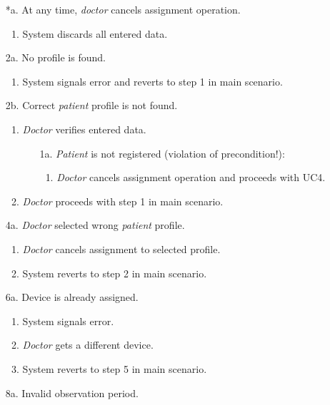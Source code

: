 \documentclass[fontsize=12pt,
               paper=a4,
               twoside=false,
               parskip=half,
               ]{scrartcl}
\begin{document}

\begin{itemize}[leftmargin=3em]
	\item[*a.] At any time, \emph{doctor} cancels assignment operation.
	\begin{enumerate}
		\item System discards all entered data.
	\end{enumerate}
	\item[2a.] No profile is found.
	\begin{enumerate}
		\item System signals error and reverts to step 1 in main scenario.
	\end{enumerate}
	\item[2b.] Correct \emph{patient} profile is not found.
	\begin{enumerate}
		\item \emph{Doctor} verifies entered data.
		\begin{itemize}
			\item[1a.] \emph{Patient} is not registered (violation of precondition!):
			\begin{enumerate}[label=\arabic*.]
				\item \emph{Doctor} cancels assignment operation and proceeds with UC4.
			\end{enumerate}
		\end{itemize}
		\item \emph{Doctor} proceeds with step 1 in main scenario.
	\end{enumerate}
	\item[4a.] \emph{Doctor} selected wrong \emph{patient} profile.
	\begin{enumerate}
		\item \emph{Doctor} cancels assignment to selected profile.
		\item System reverts to step 2 in main scenario.
	\end{enumerate}
	\item[6a.] Device is already assigned.
	\begin{enumerate}
		\item System signals error.
		\item \emph{Doctor} gets a different device.
		\item System reverts to step 5 in main scenario.
	\end{enumerate}
	\item[8a.] Invalid observation period.
	\begin{enumerate}

\end{enumerate}
\end{itemize}
\end{document}
